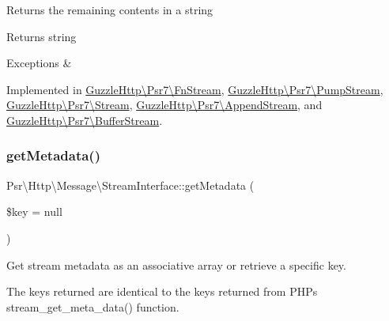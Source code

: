 Returns the remaining contents in a string

\begin{DoxyReturn}{Returns}
string 
\end{DoxyReturn}

\begin{DoxyExceptions}{Exceptions}
{\em } & \\
\hline
\end{DoxyExceptions}


Implemented in \hyperlink{classGuzzleHttp_1_1Psr7_1_1FnStream_addd020a7528c39a029acef51538c42ab}{Guzzle\+Http\textbackslash{}\+Psr7\textbackslash{}\+Fn\+Stream}, \hyperlink{classGuzzleHttp_1_1Psr7_1_1PumpStream_a15286eba4928175f71e085d042707717}{Guzzle\+Http\textbackslash{}\+Psr7\textbackslash{}\+Pump\+Stream}, \hyperlink{classGuzzleHttp_1_1Psr7_1_1Stream_a60de62d579dc9e4677452a91b7c4a336}{Guzzle\+Http\textbackslash{}\+Psr7\textbackslash{}\+Stream}, \hyperlink{classGuzzleHttp_1_1Psr7_1_1AppendStream_aee1628457e8ca34d11792dbc20de1ac0}{Guzzle\+Http\textbackslash{}\+Psr7\textbackslash{}\+Append\+Stream}, and \hyperlink{classGuzzleHttp_1_1Psr7_1_1BufferStream_aab2ed71f0cfa742e24025ad761a0cd25}{Guzzle\+Http\textbackslash{}\+Psr7\textbackslash{}\+Buffer\+Stream}.

\mbox{\label{interfacePsr_1_1Http_1_1Message_1_1StreamInterface_ac5e77fbbc7ba4235a4041d966f3aaa84}} 
\subsubsection{\texorpdfstring{get\+Metadata()}{getMetadata()}}
{\footnotesize\ttfamily Psr\textbackslash{}\+Http\textbackslash{}\+Message\textbackslash{}\+Stream\+Interface\+::get\+Metadata (\begin{DoxyParamCaption}\item[{}]{\$key = {\ttfamily null} }\end{DoxyParamCaption})}

Get stream metadata as an associative array or retrieve a specific key.

The keys returned are identical to the keys returned from P\+HP\textquotesingle{}s stream\+\_\+get\+\_\+meta\+\_\+data() function.

